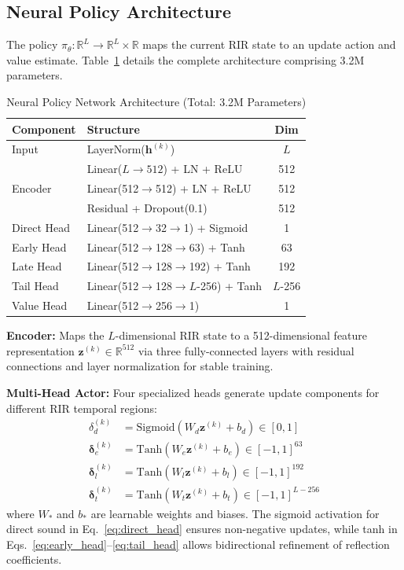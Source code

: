 \documentclass[12pt,a4paper]{article}
\begin{document}
\subsection{Neural Policy Architecture}
\label{sec:architecture}

The policy $\pi_\theta: \mathbb{R}^L \rightarrow \mathbb{R}^L \times \mathbb{R}$ maps the current RIR state to an update action and value estimate. Table~\ref{tab:architecture_overview} details the complete architecture comprising 3.2M parameters.

\begin{table}[t]
\centering
\caption{Neural Policy Network Architecture (Total: 3.2M Parameters)}
\label{tab:architecture_overview}
\small
\begin{tabular}{@{}llc@{}}
\toprule
\textbf{Component} & \textbf{Structure} & \textbf{Dim} \\
\midrule
Input & LayerNorm($\mathbf{h}^{(k)}$) & $L$ \\
\midrule
\multirow{3}{*}{Encoder} & Linear($L \to 512$) + LN + ReLU & 512 \\
 & Linear(512$\to$512) + LN + ReLU & 512 \\
 & Residual + Dropout(0.1) & 512 \\
\midrule
Direct Head & Linear(512$\to$32$\to$1) + Sigmoid & 1 \\
Early Head & Linear(512$\to$128$\to$63) + Tanh & 63 \\
Late Head & Linear(512$\to$128$\to$192) + Tanh & 192 \\
Tail Head & Linear(512$\to$128$\to$$L$-256) + Tanh & $L$-256 \\
\midrule
Value Head & Linear(512$\to$256$\to$1) & 1 \\
\bottomrule
\end{tabular}
\end{table}

\textbf{Encoder:} Maps the $L$-dimensional RIR state to a 512-dimensional feature representation $\mathbf{z}^{(k)} \in \mathbb{R}^{512}$ via three fully-connected layers with residual connections and layer normalization for stable training.

\textbf{Multi-Head Actor:} Four specialized heads generate update components for different RIR temporal regions:
\begin{align}
\delta_d^{(k)} &= \text{Sigmoid}(W_d \mathbf{z}^{(k)} + b_d) \in [0,1] \label{eq:direct_head} \\
\boldsymbol{\delta}_e^{(k)} &= \text{Tanh}(W_e \mathbf{z}^{(k)} + b_e) \in [-1,1]^{63} \label{eq:early_head} \\
\boldsymbol{\delta}_l^{(k)} &= \text{Tanh}(W_l \mathbf{z}^{(k)} + b_l) \in [-1,1]^{192} \label{eq:late_head} \\
\boldsymbol{\delta}_t^{(k)} &= \text{Tanh}(W_t \mathbf{z}^{(k)} + b_t) \in [-1,1]^{L-256} \label{eq:tail_head}
\end{align}
where $W_*$ and $b_*$ are learnable weights and biases. The sigmoid activation for direct sound in Eq.~\eqref{eq:direct_head} ensures non-negative updates, while tanh in Eqs.~\eqref{eq:early_head}--\eqref{eq:tail_head} allows bidirectional refinement of reflection coefficients.
\end{document}
